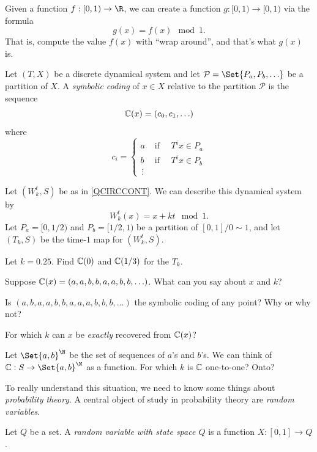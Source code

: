 	Given a function $f:[0,1)\to\R$, we can create a function $g:[0,1)\to[0,1)$ via the formula
	\[
		g(x) = f(x)\mod 1.
	\]
	That is, compute the value $f(x)$ with ``wrap around'', and that's what $g(x)$ is.

	\begin{definition}
		Let $(T,X)$ be a discrete dynamical system and let $\mathcal P=\Set{P_a,P_b,\ldots}$
		be a partition of $X$. A \emph{symbolic coding} of $x\in X$ relative to the partition $\mathcal P$
		is the sequence 
		\[
			\mathbb{C}(x)=(c_0,c_1,\ldots)
		\]
		where
		\[
			c_i = \begin{cases}
				a &\text{ if }\quad T^ix\in P_a\\
				b &\text{ if }\quad T^ix\in P_b\\
				\,\vdots &
			\end{cases}
		\]
	\end{definition}

	\question
	Let $(W^t_k,S)$ be as in \ref{QCIRCCONT}. We can describe this dynamical system by
	\[
		W^t_k(x) = x+kt\mod 1.
	\]
	Let $P_a=[0,1/2)$ and $P_b=[1/2,1)$ be a partition of $[0,1]/0\sim 1$, and let $(T_k,S)$
	be the time-$1$ map for $(W^t_k,S)$.
	\begin{parts}
		\item Let $k=0.25$. Find $\mathbb{C}(0)$ and $\mathbb{C}(1/3)$ for the $T_k$.
		\item Suppose $\mathbb{C}(x)=(a,a,b,b,a,a,b,b,\ldots)$. What can you say about $x$ and $k$?
		\item Is $(a,b,a,a,b,b,a,a,a,b,b,b,\ldots)$ the symbolic coding of any point? Why or why not?
		\item For which $k$ can $x$ be \emph{exactly} recovered from $\mathbb{C}(x)$?
		\item Let $\Set{a,b}^\N$ be the set of sequences of $a$'s and $b$'s. We can think
			of $\C:S\to\Set{a,b}^\N$ as a function. For which $k$ is $\mathbb{C}$ one-to-one? Onto?
	\end{parts}

	



	\newpage
	To really understand this situation, we need to know some things about \emph{probability theory}.
	A central object of study in probability theory are \emph{random variables}.

	\begin{definition}
		Let $Q$ be a set. A \emph{random variable with state space $Q$} is a function $X:[0,1]\to Q$.
	\end{definition}

